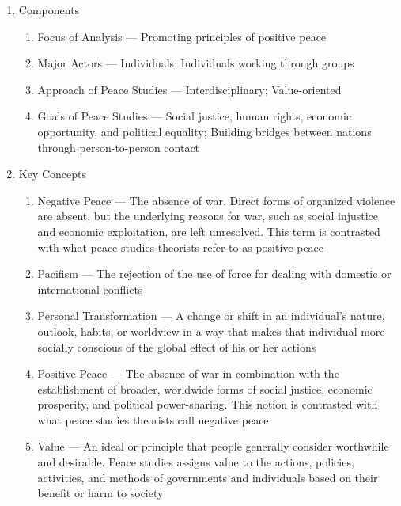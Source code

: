 \documentclass[12pt]{article}
\begin{document}
\begin{enumerate}
      \item Components

        \begin{enumerate}

          \item Focus of Analysis — Promoting principles of positive peace

          \item Major Actors — Individuals; Individuals working through groups

          \item Approach of Peace Studies — Interdisciplinary; Value-oriented

          \item Goals of Peace Studies — Social justice, human rights, economic opportunity, and political equality; Building bridges between nations through person-to-person contact

        \end{enumerate}

      \item Key Concepts

        \begin{enumerate}

          \item Negative Peace — The absence of war. Direct forms of organized violence are absent, but the underlying reasons for war, such as social injustice and economic exploitation, are left unresolved. This term is contrasted with what peace studies theorists refer to as positive peace

          \item Pacifism — The rejection of the use of force for dealing with domestic or international conflicts

          \item Personal Transformation — A change or shift in an individual's nature, outlook, habits, or worldview in a way that makes that individual more socially conscious of the global effect of his or her actions

          \item Positive Peace — The absence of war in combination with the establishment of broader, worldwide forms of social justice, economic prosperity, and political power-sharing. This notion is contrasted with what peace studies theorists call negative peace

          \item Value — An ideal or principle that people generally consider worthwhile and desirable. Peace studies assigns value to the actions, policies, activities, and methods of governments and individuals based on their benefit or harm to society


\end{enumerate}
\end{enumerate}
\end{document}
